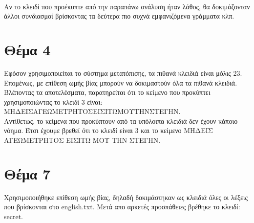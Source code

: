 \documentclass[a4paper, 11pt]{article}
\newcommand{\lt}{\latintext}
\begin{document}
\\
Αν το κλειδί που προέκυπτε από την παραπάνω ανάλυση ήταν λάθος, θα δοκιμάζονταν άλλοι συνδιασμοί βρίσκοντας τα δεύτερα πιο συχνά εμφανιζόμενα γράμματα κλπ.

\section*{Θέμα 4}
Εφόσον χρησιμοποιείται το σύστημα μετατόπισης, τα πιθανά κλειδιά είναι μόλις 23. Επομένως, με επίθεση ωμής βίας μπορούν να
δοκιμαστούν όλα τα πιθανά κλειδιά. Βλέποντας τα αποτελέσματα, παρατηρείται ότι το κείμενο που προκύπτει χρησιμοποιώντας το κλειδί 3 είναι:\\
ΜΗΔΕΙΣΑΓΕΩΜΕΤΡΗΤΟΣΕΙΣΙΤΩΜΟΥΤΗΝΣΤΕΓΗΝ.\\
Αντίθετως, το κείμενα που προκύπτουν από τα υπόλοιπα κλειδιά δεν έχουν κάποιο νόημα. Έτσι έχουμε βρεθεί ότι
το κλειδί είναι 3 και το κείμενο ΜΗΔΕΙΣ ΑΓΕΩΜΕΤΡΗΤΟΣ ΕΙΣΙΤΩ ΜΟΥ ΤΗΝ ΣΤΕΓΗΝ.


\section*{Θέμα 7}
Χρησιμοποιήθηκε επίθεση ωμής βίας, δηλαδή δοκιμάστηκαν ως κλειδιά όλες οι λέξεις που βρίσκονται στο {\lt english.txt}. Μετά απο αρκετές προσπάθειες
βρέθηκε το κλειδί: {\lt secret}.
\end{document}

